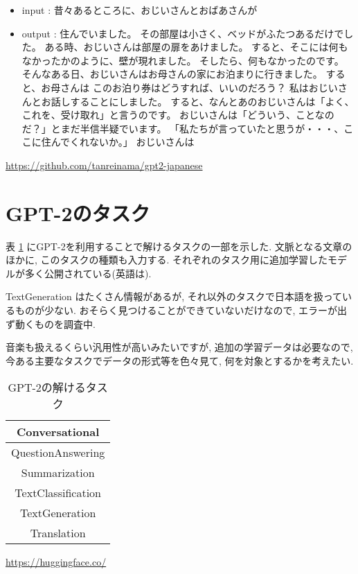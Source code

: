 \documentclass[twocolumn]{jarticle}     %
\begin{document}
\begin{itemize}
  \item input : 昔々あるところに、おじいさんとおばあさんが
  \item output : 住んでいました。
その部屋は小さく、ベッドがふたつあるだけでした。
ある時、おじいさんは部屋の扉をあけました。
すると、そこには何もなかったかのように、壁が現れました。
そしたら、何もなかったのです。
そんなある日、おじいさんはお母さんの家にお泊まりに行きました。
すると、お母さんは
このお泊り券はどうすれば、いいのだろう？
私はおじいさんとお話しすることにしました。
すると、なんとあのおじいさんは「よく、これを、受け取れ」と言うのです。
おじいさんは「どういう、ことなのだ？」とまだ半信半疑でいます。
「私たちが言っていたと思うが・・・、ここに住んでくれないか。」
おじいさんは
\end{itemize}

\url{https://github.com/tanreinama/gpt2-japanese}

\section{GPT-2のタスク}
表 \ref{tab:task} にGPT-2を利用することで解けるタスクの一部を示した.
文脈となる文章のほかに, このタスクの種類も入力する.
それぞれのタスク用に追加学習したモデルが多く公開されている(英語は).

TextGeneration はたくさん情報があるが,
それ以外のタスクで日本語を扱っているものが少ない.
おそらく見つけることができていないだけなので, エラーが出ず動くものを調査中.

音楽も扱えるくらい汎用性が高いみたいですが,
追加の学習データは必要なので, 今ある主要なタスクでデータの形式等を色々見て,
何を対象とするかを考えたい.

\begin{table}[tb]
  \begin{center}
    \caption{GPT-2の解けるタスク}
    \begin{tabular}{|c|} \hline
      Conversational \\ \hline
      QuestionAnswering \\ \hline
      Summarization \\ \hline
      TextClassification \\ \hline
      TextGeneration \\ \hline
      Translation \\ \hline
    \end{tabular}
    \label{tab:task}
  \end{center}
\end{table}
\url{https://huggingface.co/}
\end{document}
